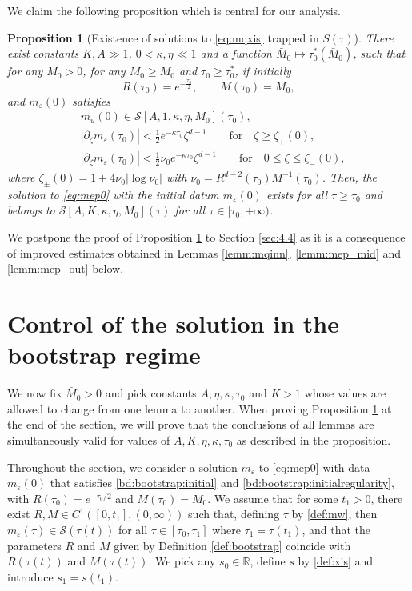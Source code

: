 \documentclass[11pt]{aims}
\newtheorem{proposition}[theorem]{Proposition}
\theoremstyle{definition}
\newcommand{\Sc}{\mathcal{S}}
\newcommand{\pa}{\partial}
\newcommand{\be}{\begin{equation}}
\newcommand{\ee}{\end{equation}}
\numberwithin{equation}{section}
\begin{document}
\noindent We claim the following proposition which is central for our analysis.
\begin{proposition}[Existence of solutions to \eqref{eq:mqxis} trapped in $S(\tau)$]  \label{prop:trap_mq} There exist constants $K,A \gg 1$, $0 < \kappa,\eta \ll 1$ and a function $\bar M_0\mapsto \tau_0^*(\bar M_0)$, such that for any $\bar M_0>0$, for any $M_0\geq \bar M_0$ and $\tau_0\geq \tau_0^*$, if initially
\be \label{bootstrap:choiceR0}
R(\tau_0)=e^{-\frac{\tau_0}{2}}, \qquad M(\tau_0)=M_0,
\ee
and $m_\varepsilon(0)$ satisfies
\begin{align}
& \label{bd:bootstrap:initial} m_u (0) \in \Sc [A,1,\kappa,\eta,M_0](\tau_0), \\
& \label{bd:bootstrap:initialregularity}
|\pa_\zeta m_\varepsilon (\tau_0) | < \frac 12 e^{-\kappa \tau_0}\zeta^{d-1} \qquad \mbox{for} \quad \zeta \geq \zeta_+(0),\\
& |\pa_\zeta m_\varepsilon (\tau_0) | < \frac 12 \nu_0 e^{-\kappa \tau_0}\zeta^{d-1} \qquad \mbox{for} \quad 0 \leq \zeta \leq \zeta_-(0),
\end{align}
where $\zeta_\pm(0)=1\pm 4 \nu_0 |\log \nu_0| $ with $\nu_0=R^{d-2}(\tau_0)M^{-1}(\tau_0)$. Then, the solution to \eqref{eq:mep0} with the initial datum $m_\varepsilon(0)$ exists for all $\tau \geq \tau_0$ and belongs to $\Sc [A,K,\kappa,\eta,M_0](\tau)$ for all $\tau \in [\tau_0, +\infty)$.
\end{proposition}

 We postpone the proof of Proposition \ref{prop:trap_mq}  to Section \ref{sec:4.4} as it is a consequence of improved estimates obtained in Lemmas \ref{lemm:mqinn}, \ref{lemm:mep_mid} and \ref{lemm:mep_out} below. 



\section{Control of the solution in the bootstrap regime} \label{sec:4}

We now fix $\bar M_0>0$ and pick constants $A,\eta,\kappa,\tau_0$ and $K>1$ whose values are allowed to change from one lemma to another. When proving Proposition \ref{prop:trap_mq} at the end of the section, we will prove that the conclusions of all lemmas are simultaneously valid for values of $A,K,\eta,\kappa,\tau_0$ as described in the proposition.

Throughout the section, we consider a solution $m_\varepsilon$ to \eqref{eq:mep0} with data $m_\varepsilon(0)$ that satisfies \eqref{bd:bootstrap:initial} and \eqref{bd:bootstrap:initialregularity}, with $R(\tau_0)=e^{-\tau_0/2}$ and $M(\tau_0)=M_0$. We assume that for some $t_1>0$, there exist $R,M\in C^1([0,t_1],(0,\infty))$ such that, defining $\tau$ by \eqref{def:mw}, then $m_\varepsilon(\tau)\in \Sc (\tau(t))$ for all $\tau \in [\tau_0,\tau_1]$ where $\tau_1=\tau(t_1)$, and that the parameters $R$ and $M$ given by Definition \ref{def:bootstrap} coincide with $R(\tau(t))$ and $M(\tau(t))$. We pick any $s_0\in \mathbb R$, define $s$ by \eqref{def:xis} and introduce $s_1=s(t_1)$.
\end{document}

